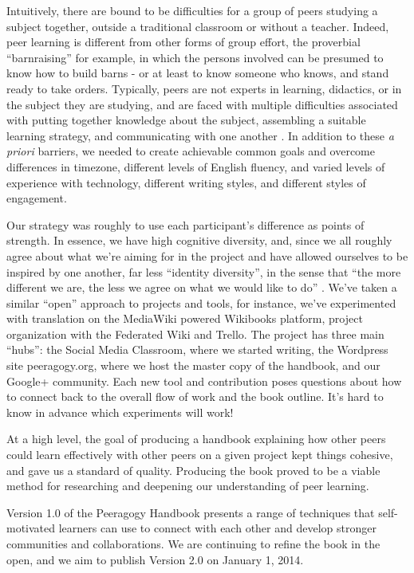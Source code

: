 \documentclass{acm_proc_article-sp}
\begin{document}
Intuitively, there are bound to be difficulties for a group of peers studying a subject together, outside a traditional classroom or without a teacher. Indeed, peer learning is different from other forms of group effort, the proverbial ``barnraising'' for example, in which the persons involved can be presumed to know how to build barns - or at least to know someone who knows, and stand ready to take orders.  Typically, peers are not experts in learning, didactics, or in the subject they are studying, and are faced with multiple difficulties associated with putting together knowledge about the subject, assembling a suitable learning strategy, and communicating with one another \cite{paragogy}.  In addition to these \emph{a priori} barriers, we needed to create achievable common goals and overcome differences in timezone, different levels of English fluency, and varied levels of experience with technology, different writing styles, and different styles of engagement.

Our strategy was roughly to use each participant's difference as
points of strength.  In essence, we have high cognitive diversity,
and, since we all roughly agree about what we're aiming for in the
project and have allowed ourselves to be inspired by one another, far
less ``identity diversity'', in the sense that ``the more different we
are, the less we agree on what we would like to do''
\cite{Page2008difference}.  We've taken a similar ``open'' approach to
projects and tools, for instance, we've experimented with translation
on the MediaWiki powered Wikibooks platform, project organization with
the Federated Wiki and Trello.  The project has three main ``hubs'':
the Social Media Classroom, where we started writing, the Wordpress
site peeragogy.org, where we host the master copy of the handbook, and
our Google+ community.  Each new tool and contribution poses questions
about how to connect back to the overall flow of work and the book
outline.  It's hard to know in advance which experiments will work!

At a high level, the goal of producing a handbook explaining how other
peers could learn effectively with other peers on a given project kept
things cohesive, and gave us a standard of quality.  Producing the
book proved to be a viable method for researching and deepening our
understanding of peer learning.

Version 1.0 of the Peeragogy Handbook presents a range of techniques
that self-motivated learners can use to connect with each other and
develop stronger communities and collaborations.  We are continuing to
refine the book in the open, and we aim to publish Version 2.0 on
January 1, 2014.
\end{document}
